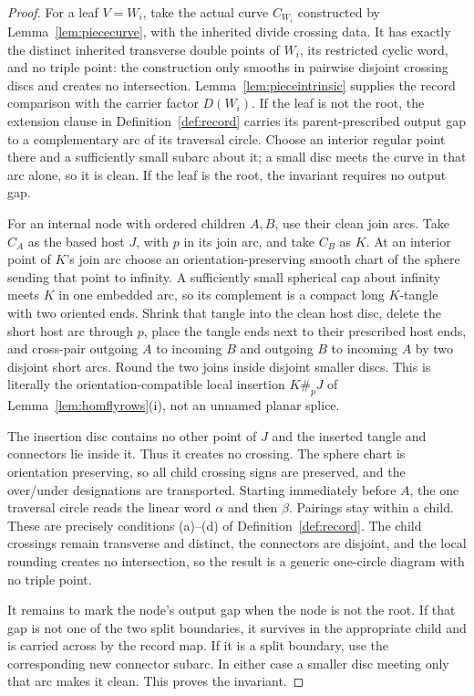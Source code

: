 \begin{proof}
For a leaf $V=W_i$, take the actual curve $C_{W_i}$ constructed by
Lemma~\ref{lem:piececurve}, with the inherited divide crossing data. It has
exactly the distinct inherited transverse double points of $W_i$, its
restricted cyclic word, and no triple point: the construction only smooths in
pairwise disjoint crossing discs and creates no intersection.
Lemma~\ref{lem:pieceintrinsic} supplies the record comparison with the carrier
factor $D(W_i)$. If the leaf is not the root, the extension clause in
Definition~\ref{def:record} carries its parent-prescribed output gap to a
complementary arc of its traversal circle. Choose an interior regular point
there and a sufficiently small subarc about it; a small disc meets the curve
in that arc alone, so it is clean. If the leaf is the root, the invariant
requires no output gap.

For an internal node with ordered children $A,B$, use their clean join arcs.
Take $C_A$ as the based host $J$, with $p$ in its join arc, and take $C_B$ as
$K$. At an interior point of $K$'s join arc choose an
orientation-preserving smooth chart of the sphere sending that point to
infinity. A sufficiently small spherical cap about infinity meets $K$ in one
embedded arc, so its complement is a compact long $K$-tangle with two oriented
ends. Shrink that tangle into the clean host disc, delete the short host arc
through $p$, place the tangle ends next to their prescribed host ends, and
cross-pair outgoing $A$ to incoming $B$ and outgoing $B$ to incoming $A$ by
two disjoint short arcs. Round the two joins inside disjoint smaller discs.
This is literally the orientation-compatible local insertion $K\#_pJ$ of
Lemma~\ref{lem:homflyrows}(i), not an unnamed planar splice.

The insertion disc contains no other point of $J$ and the inserted tangle and
connectors lie inside it. Thus it creates no crossing. The sphere chart is
orientation preserving, so all child crossing signs are preserved, and the
over/under designations are transported. Starting immediately before $A$, the
one traversal circle reads the linear word $\alpha$ and then $\beta$.
Pairings stay within a child. These are precisely conditions (a)--(d) of
Definition~\ref{def:record}. The child crossings remain transverse and
distinct, the connectors are disjoint, and the local rounding creates no
intersection, so the result is a generic one-circle diagram with no triple
point.

It remains to mark the node's output gap when the node is not the root. If that
gap is not one of the two split boundaries, it survives in the appropriate
child and is carried across by the record map. If it is a split boundary, use
the corresponding new connector subarc. In either case a smaller disc meeting
only that arc makes it clean. This proves the invariant.


\end{proof}
